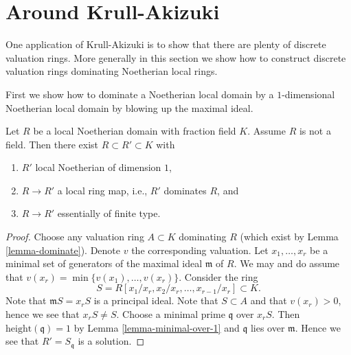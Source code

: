 \section{Around Krull-Akizuki}
\label{section-krull-akizuki}

\noindent
One application of Krull-Akizuki is to show that there are plenty
of discrete valuation rings. More generally in this section we
show how to construct discrete valuation rings dominating Noetherian
local rings.

\medskip\noindent
First we show how to dominate a Noetherian local domain
by a $1$-dimensional Noetherian local domain by blowing up
the maximal ideal.

\begin{lemma}
\label{lemma-dominate-by-dimension-1}
Let $R$ be a local Noetherian domain with fraction field $K$.
Assume $R$ is not a field.
Then there exist $R \subset R' \subset K$ with
\begin{enumerate}
\item $R'$ local Noetherian of dimension $1$,
\item $R \to R'$ a local ring map, i.e., $R'$ dominates $R$, and
\item $R \to R'$ essentially of finite type.
\end{enumerate}
\end{lemma}

\begin{proof}
Choose any valuation ring $A \subset K$ dominating $R$ (which
exist by Lemma \ref{lemma-dominate}).
Denote $v$ the corresponding valuation.
Let $x_1, \ldots, x_r$ be a minimal set of generators of the
maximal ideal $\mathfrak m$ of $R$. We may and do assume that
$v(x_r) = \min\{v(x_1), \ldots, v(x_r)\}$. Consider the ring
$$
S = R[x_1/x_r, x_2/x_r, \ldots, x_{r - 1}/x_r] \subset K.
$$
Note that $\mathfrak mS = x_rS$ is a principal ideal.
Note that $S \subset A$ and that $v(x_r) > 0$, hence we see
that $x_rS \not = S$. Choose a minimal prime $\mathfrak q$
over $x_rS$. Then $\text{height}(\mathfrak q) = 1$ by
Lemma \ref{lemma-minimal-over-1}
and $\mathfrak q$ lies over $\mathfrak m$. Hence we
see that $R' = S_{\mathfrak q}$ is a solution.
\end{proof}

